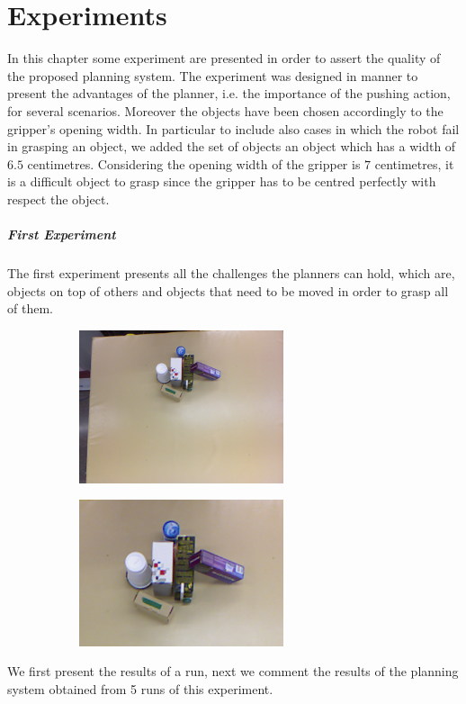 \chapter{Experiments}
\label{ch:experiments}

In this chapter some experiment are presented in order to assert the quality of the proposed planning system. The experiment was designed in manner to present the advantages of the planner, i.e. the importance of the pushing action, for several scenarios. Moreover the objects have been chosen accordingly to the gripper's opening width. In particular to include also cases in which the robot fail in grasping an object, we added the set of objects an object which has a width of $6.5$ centimetres. Considering the opening width of the gripper is $7$ centimetres, it is a difficult object to grasp since the gripper has to be centred perfectly with respect the object. 

\paragraph{First Experiment}
The first experiment presents all the challenges the planners can hold, which are, objects on top of others and objects that need to be moved in order to grasp all of them. 
\begin{figure}[h]
\centering
\begin{subfigure}[t]{0.45\textwidth}
\centering
\includegraphics[width=6cm]{Img/experiments/exp1/image.png}
\caption{}
\end{subfigure}
\begin{subfigure}[t]{0.45\textwidth}
\centering
\includegraphics[width=6cm]{Img/experiments/exp1/objects.png}
\caption{}
\end{subfigure}
\caption{}
\end{figure}
We first present the results of a run, next we comment the results of the planning system obtained from 5 runs of this experiment. 


